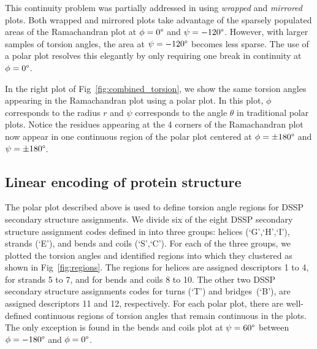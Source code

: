 \documentclass[10pt,letterpaper]{article}
\renewcommand{\figurename}{Fig}
\begin{document}
\begin{figure*}[!h]
\caption{Ramachandran plot (right) and polar plot (left) of randomly sampled torsion angles}
\label{fig:combined_torsion}
\end{figure*}

This continuity problem was partially addressed in \cite{Karplus2010} using \emph{wrapped} and \emph{mirrored} plots. 
Both wrapped and mirrored plots take advantage of the sparsely populated areas of the Ramachandran plot at $\phi = 0\degree$ and $\psi = -120\degree$.
However, with larger samples of torsion angles, the area at $\psi = -120\degree$ becomes less sparse. 
The use of a polar plot resolves this elegantly by only requiring one break in continuity at $\phi = 0\degree$. 

In the right plot of \figurename~\ref{fig:combined_torsion}, we show the same torsion angles appearing in the Ramachandran plot using a polar plot. 
In this plot, $\phi$ corresponds to the radius $r$ and $\psi$ corresponds to the angle $\theta$ in traditional polar plots. 
Notice the residues appearing at the 4 corners of the Ramachandran plot now appear in one continuous region of the polar plot centered at $\phi = \pm180\degree$ and $\psi = \pm180\degree$. 

\subsection*{Linear encoding of protein structure}

The polar plot described above is used to define torsion angle regions for DSSP secondary structure assignments.
We divide six of the eight DSSP secondary structure assignment codes defined in \cite{Kabsch1983} into three groups: helices (`G',`H',`I'), strands (`E'), and bends and coils (`S',`C').
For each of the three groups, we plotted the torsion angles and identified regions into which they clustered as shown in \figurename~\ref{fig:regions}.
The regions for helices are assigned descriptors 1 to 4, for strands 5 to 7, and for bends and coils 8 to 10. 
The other two DSSP secondary structure assignments codes for turns (`T') and bridges~(`B'), are assigned descriptors 11 and 12, respectively.
For each polar plot, there are well-defined continuous regions of torsion angles that remain continuous in the plots. 
The only exception is found in the bends and coils plot at $\psi = 60\degree$ between $\phi = -180\degree$ and $\phi = 0\degree$.

\begin{figure*}[!h]
\caption{Polar plots of randomly sampled torsion angles with designated descriptors for region and DSSP code combinations}
\label{fig:regions}
\end{figure*}
\end{document}
